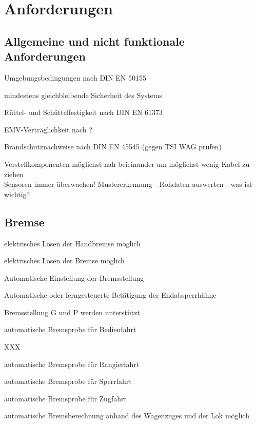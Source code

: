 \section{Anforderungen}
\subsection{Allgemeine und nicht funktionale Anforderungen}
\begin{feat}[Anf. X]
Umgebungsbedingungen nach \acrshort{DIN} \acrshort{EN} 50155
\end{feat}
\begin{feat}[Anf. X]
mindestens gleichbleibende Sicherheit des Systems
\end{feat}
\begin{feat}[Anf. X]
Rüttel- und Schüttelfestigkeit nach \acrshort{DIN} \acrshort{EN} 61373
\end{feat}
\begin{feat}
EMV-Verträglichkeit nach ?
\end{feat}
\begin{feat}
Brandschutznachweise nach \acrshort{DIN} \acrshort{EN} 45545 (gegen TSI WAG prüfen)
\end{feat}
Verstellkomponenten möglichst nah beieinander um möglichst wenig Kabel zu ziehen\\
Sensoren immer überwachen! Mustererkennung - Rohdaten auswerten - was ist wichtig?
\subsection{Bremse}
\begin{feat}[REQ. 9]
elektrisches Lösen der Handbremse möglich
\end{feat}
\begin{feat}[REQ. 10]
elektrisches Lösen der Bremse möglich
\end{feat}
\begin{feat}[REQ. 11]
Automatische Einstellung der Bremsstellung
\end{feat}
\begin{feat}[REQ. 12]
Automatische oder ferngesteuerte Betätigung der Endabsperrhähne
\end{feat}
\begin{feat}[REQ. 12]
Bremsstellung G und P werden unterstützt
\end{feat}
\begin{feat}[REQ. 13]
automatische Bremsprobe für Bedienfahrt
\end{feat}
\begin{rem}
XXX
\end{rem}
\begin{feat}
automatische Bremsprobe für Rangierfahrt
\end{feat}
\begin{feat}
automatische Bremsprobe für Sperrfahrt
\end{feat}
\begin{feat}
automatische Bremsprobe für Zugfahrt
\end{feat}
\begin{feat}
automatische Bremsberechnung anhand des Wagenzuges und der Lok möglich
\end{feat}


